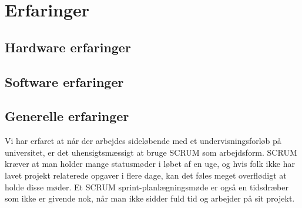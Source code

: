 \chapter{Erfaringer}

\section{Hardware erfaringer}



\section{Software erfaringer}



\section{Generelle erfaringer}

Vi har erfaret at når der arbejdes sideløbende med et undervisningsforløb på universitet, er det uhensigtsmæssigt at bruge SCRUM som arbejdsform. SCRUM kræver at man holder mange statusmøder i løbet af en uge, og hvis folk ikke har lavet projekt relaterede opgaver i flere dage, kan det føles meget overflødigt at holde disse møder. Et SCRUM sprint-planlægningsmøde er også en tidsdræber som ikke er givende nok, når man ikke sidder fuld tid og arbejder på sit projekt.

